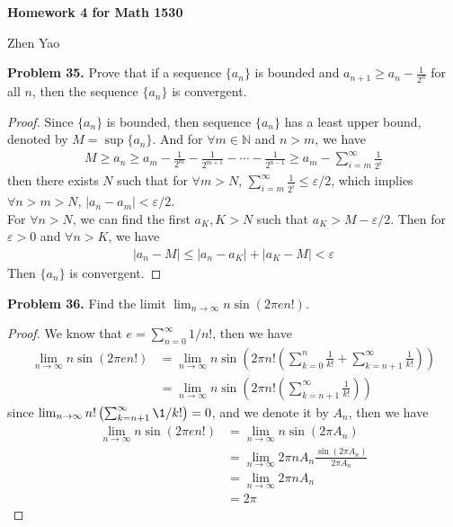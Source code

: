 \documentclass[12pt,leqno]{amsart}
\begin{document}
\centerline{\bf Homework 4 for Math 1530}
\centerline{Zhen Yao}

\bigskip

\noindent
{\bf Problem 35.}
Prove that if a sequence $\{ a_n\}$ is bounded and $\displaystyle a_{n+1}\geq a_n-\frac{1}{2^n}$
for all $n$, then the sequence $\{a_n\}$ is convergent.
\begin{proof}
Since $\{a_n\}$ is bounded, then sequence $\{a_n\}$ has a least upper bound, denoted by $M = \sup \{a_n\}$. And for $\forall m \in \mathbb{N}$ and $n>m$, we have  
\begin{align*}
    M \geq a_n \geq a_m - \frac{1}{2^m} - \frac{1}{2^{m+1}} - \cdots - \frac{1}{2^{n-1}} \geq a_m - \sum^\infty_{i=m}\frac{1}{2^i}
\end{align*}
then there exists $N$ such that for $\forall m > N$, $\sum^\infty_{i=m}\frac{1}{2^i} \leq \varepsilon/2$, which implies $\forall n > m > N$, $|a_n - a_m| < \varepsilon/2$. \\
\hspace*{3em}For $\forall n > N$, we can find the first $a_K, K > N$ such that $a_K > M - \varepsilon/2$. Then for $\varepsilon > 0$ and $\forall n > K$, we have
\begin{align*}
    |a_n - M| \leq |a_n - a_K| + |a_K - M| < \varepsilon
\end{align*}
Then $\{a_n\}$ is convergent.
\end{proof}

\medskip

\noindent
{\bf Problem 36.}
Find the limit
$\displaystyle\lim_{n\to\infty} n\sin(2\pi e n!)$.
\begin{proof}
We know that $e = \sum^\infty_{n=0}1/n!$, then we have 
\begin{align*}
    \lim_{n\to\infty} n\sin(2\pi e n!) & = \lim_{n\to\infty} n\sin\left(2\pi n! \left(\sum^n_{k=0}\frac{1}{k!} + \sum^\infty_{k=n+1}\frac{1}{k!} \right)\right) \\
    & = \lim_{n\to\infty} n\sin\left(2\pi n! \left( \sum^\infty_{k=n+1}\frac{1}{k!} \right)\right)
\end{align*}
since $\lim_{n\to\infty} n! \left( \sum^\infty_{k=n+1}\1/k! \right) = 0$, and we denote it by $A_n$, then we have
\begin{align*}
    \lim_{n\to\infty} n\sin(2\pi e n!) & = \lim_{n\to\infty} n\sin(2\pi A_n) \\
    & = \lim_{n\to\infty} 2\pi n A_n \frac{\sin(2\pi A_n)}{2\pi A_n} \\
    & = \lim_{n\to\infty} 2\pi n A_n \\
    & = 2 \pi
\end{align*}
\end{proof}
\end{document}
